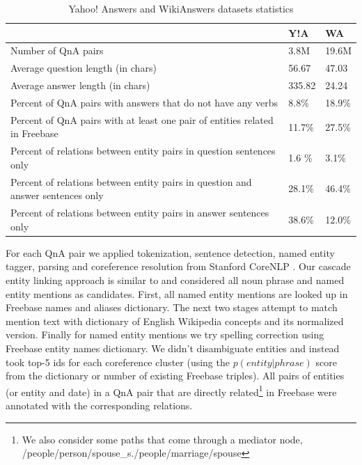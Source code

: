 \begin{table}[ht]
\centering
\begin{tabular}{|p{12.5cm}||p{1.2cm}|p{1.2cm}|} \hline
& Y!A & WA\\
\hline
Number of QnA pairs & 3.8M & 19.6M \\
Average question length (in chars) & 56.67 & 47.03 \\
Average answer length (in chars) & 335.82 & 24.24 \\
Percent of QnA pairs with answers that do not have any verbs & 8.8\% & 18.9\% \\
Percent of QnA pairs with at least one pair of entities related in Freebase & 11.7\% & 27.5\% \\
Percent of relations between entity pairs in question sentences only & 1.6 \% & 3.1\% \\
Percent of relations between entity pairs in question and answer sentences only & 28.1\% & 46.4\% \\
Percent of relations between entity pairs in answer sentences only & 38.6\%& 12.0\%\\
\hline
\end{tabular}
\caption{Yahoo! Answers and WikiAnswers datasets statistics}
\label{table:qna_relextract:cqastats}
\end{table}

For each QnA pair we applied tokenization, sentence detection, named entity tagger, parsing and coreference resolution from Stanford CoreNLP \cite{manning-EtAl:2014:P14-5}.
Our cascade entity linking approach is similar to \cite{chang2011stanford} and considered all noun phrase and named entity mentions as candidates.
First, all named entity mentions are looked up in Freebase names and aliases dictionary.
The next two stages attempt to match mention text with dictionary of English Wikipedia concepts \cite{spitkovsky2012cross} and its normalized version.
Finally for named entity mentions we try spelling correction using Freebase entity names dictionary.
We didn't disambiguate entities and instead took top-5 ids for each coreference cluster (using the $p(entity|phrase)$ score from the dictionary or number of existing Freebase triples).
All pairs of entities (or entity and date) in a QnA pair that are directly related\footnote{We also consider some paths that come through a mediator node, \eg  /people/person/spouse\_s./people/marriage/spouse} in Freebase were annotated with the corresponding relations.

